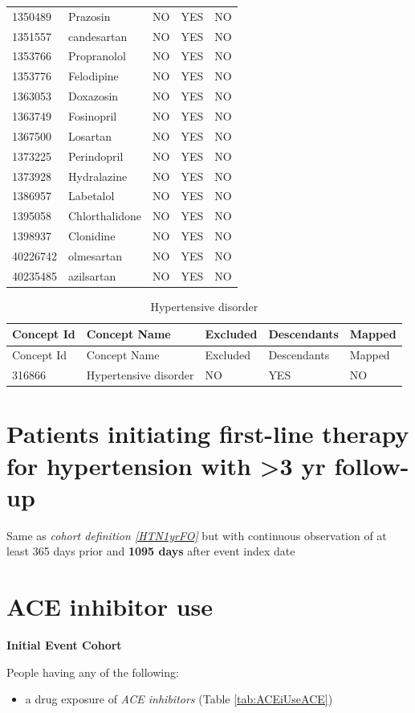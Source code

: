 \documentclass[11pt]{book}
\providecommand{\tightlist}{%
  \setlength{\itemsep}{0pt}\setlength{\parskip}{0pt}}
\theoremstyle{definition}
\theoremstyle{definition}
\theoremstyle{definition}
\theoremstyle{remark}
\begin{document}
\begin{longtable}[]{@{}lllll@{}}
1350489 & Prazosin & NO & YES & NO\tabularnewline
1351557 & candesartan & NO & YES & NO\tabularnewline
1353766 & Propranolol & NO & YES & NO\tabularnewline
1353776 & Felodipine & NO & YES & NO\tabularnewline
1363053 & Doxazosin & NO & YES & NO\tabularnewline
1363749 & Fosinopril & NO & YES & NO\tabularnewline
1367500 & Losartan & NO & YES & NO\tabularnewline
1373225 & Perindopril & NO & YES & NO\tabularnewline
1373928 & Hydralazine & NO & YES & NO\tabularnewline
1386957 & Labetalol & NO & YES & NO\tabularnewline
1395058 & Chlorthalidone & NO & YES & NO\tabularnewline
1398937 & Clonidine & NO & YES & NO\tabularnewline
40226742 & olmesartan & NO & YES & NO\tabularnewline
40235485 & azilsartan & NO & YES & NO\tabularnewline
\bottomrule
\end{longtable}

\begin{longtable}[]{@{}lllll@{}}
\caption{\label{tab:HTN1yrFOHypertensiveDisorder} Hypertensive disorder}\tabularnewline
\toprule
Concept Id & Concept Name & Excluded & Descendants & Mapped\tabularnewline
\midrule
\endfirsthead
\toprule
Concept Id & Concept Name & Excluded & Descendants & Mapped\tabularnewline
\midrule
\endhead
316866 & Hypertensive disorder & NO & YES & NO\tabularnewline
\bottomrule
\end{longtable}

\hypertarget{HTN3yrFO}{%
\section{Patients initiating first-line therapy for hypertension with \textgreater3 yr follow-up}\label{HTN3yrFO}}

Same as \emph{cohort definition \ref{HTN1yrFO}} but with continuous observation of at least 365 days prior and \textbf{1095 days} after event index date

\hypertarget{ACEiUse}{%
\section{ACE inhibitor use}\label{ACEiUse}}

\textbf{Initial Event Cohort}

People having any of the following:

\begin{itemize}
\tightlist
\item
  a drug exposure of \emph{ACE inhibitors} (Table \ref{tab:ACEiUseACE})
\end{itemize}
\end{document}
